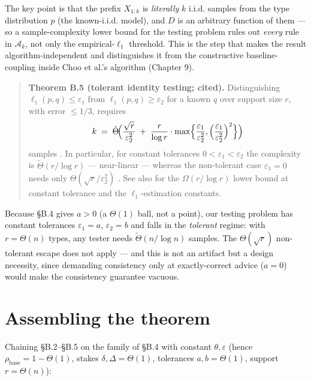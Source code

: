 The key point is that the prefix \(X_{1:k}\) is \emph{literally} \(k\)
i.i.d. samples from the type distribution \(p\) (the known-i.i.d.
model), and \(D\) is an arbitrary function of them --- so a
sample-complexity lower bound for the testing problem rules out
\emph{every} rule in \(\mathcal A_k\), not only the empirical-\(\ell_1\)
threshold. This is the step that makes the result algorithm-independent
and distinguishes it from the constructive baseline-coupling inside Choo
et al.'s algorithm (Chapter 9).

\begin{quote}
\textbf{Theorem B.5 (tolerant identity testing; cited).} Distinguishing
\(\ell_1(p,q)\le\varepsilon_1\) from \(\ell_1(p,q)\ge\varepsilon_2\) for
a known \(q\) over support size \(r\), with error \(\le 1/3\), requires
\[k \;=\; \tilde\Theta\!\Bigl(\frac{\sqrt r}{\varepsilon_2^2}
\;+\; \frac{r}{\log r}\cdot\max\Bigl\{\frac{\varepsilon_1}{\varepsilon_2^2},
\Bigl(\frac{\varepsilon_1}{\varepsilon_2^2}\Bigr)^2\Bigr\}\Bigr)\]
samples \autocite{canonne2022tolerance}. In particular, for constant
tolerances \(0<\varepsilon_1<\varepsilon_2\) the complexity is
\(\tilde\Theta(r/\log r)\) --- near-linear --- whereas the non-tolerant
case \(\varepsilon_1=0\) needs only \(\Theta(\sqrt r/\varepsilon_2^2)\)
\autocite{paninski2008coincidence,valiant2017automatic}. See also
\autocite{valiant2011unseen,jiao2018l1} for the \(\Omega(r/\log r)\)
lower bound at constant tolerance and the \(\ell_1\)-estimation
constants.
\end{quote}

Because §B.4 gives \(a>0\) (a \(\Theta(1)\) ball, not a point), our
testing problem has constant tolerances \(\varepsilon_1=a\),
\(\varepsilon_2=b\) and falls in the \emph{tolerant} regime: with
\(r=\Theta(n)\) types, any tester needs \(\tilde\Theta(n/\log n)\)
samples. The \(\Theta(\sqrt r)\) non-tolerant escape does not apply ---
and this is not an artifact but a design necessity, since demanding
consistency only at exactly-correct advice (\(a=0\)) would make the
consistency guarantee vacuous.

\section{Assembling the theorem}

Chaining §B.2--§B.5 on the family of §B.4 with constant
\(\theta,\varepsilon\) (hence \(\rho_{\mathrm{base}}=1-\Theta(1)\),
stakes \(\delta,\Delta=\Theta(1)\), tolerances \(a,b=\Theta(1)\),
support \(r=\Theta(n)\)):

